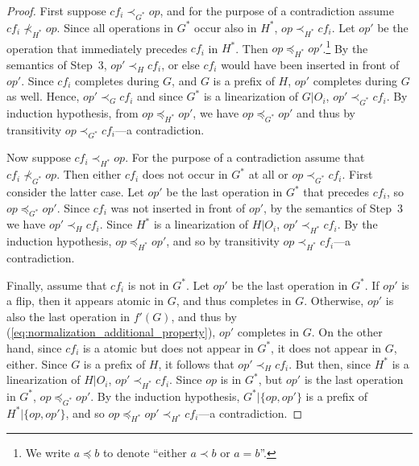 \documentclass[11pt,letterpaper]{article}
\begin{document}
\begin{proof}
  First suppose $cf_i\prec_{G^\ast} op$, and for the purpose of a contradiction assume
  $cf_i\not\prec_{H^\ast} op$.
  Since all operations in $G^\ast$ occur also in $H^\ast$, $op\prec_{H^\ast} cf_i$.
  Let $op'$ be the operation that immediately precedes $cf_i$ in $H^\ast$.
  Then $op\preceq_{H^\ast} op'$.\footnote{We write $a\preceq b$ to denote ``either $a\prec b$ or $a=b$''.}
  By the semantics of Step~3, $op'\prec_H cf_i$, or else $cf_i$ would have been inserted in front of $op'$.
  Since $cf_i$ completes during $G$, and $G$ is a prefix of $H$, $op'$ completes during $G$ as well.
  Hence, $op'\prec_G cf_i$ and since $G^\ast$ is a linearization of $G|O_i$, $op'\prec_{G^\ast} cf_i$.
  By induction hypothesis, from $op\preceq_{H^\ast} op'$, we have $op\preceq_{G^\ast} op'$ and thus by transitivity $op\prec_{G^\ast} cf_i$---a contradiction.

  Now suppose $cf_i\prec_{H^\ast} op$.
  For the purpose of a contradiction assume that $cf_i\not\prec_{G^\ast} op$.
  Then either $cf_i$ does not occur in $G^\ast$ at all or $op \prec_{G^\ast} cf_i$.
  First consider the latter case.
  Let $op'$ be the last operation in $G^\ast$ that precedes $cf_i$, so $op\preceq_{G^\ast} op'$.
  Since $cf_i$ was not inserted in front of $op'$, by the semantics of Step~3 we have $op'\prec_H cf_i$.
  Since $H^\ast$ is a linearization of $H|O_i$, $op'\prec_{H^\ast} cf_i$.
  By the induction hypothesis, $op\preceq_{H^\ast} op'$, and so by transitivity $op\prec_{H^\ast} cf_i$---a contradiction.

  Finally, assume that $cf_i$ is not in $G^\ast$.
  Let $op'$ be the last operation in $G^\ast$.
  If $op'$ is a flip, then it appears atomic in $G$, and thus completes in $G$.
  Otherwise, $op'$ is also the last operation in $f'(G)$, and thus by (\ref{eq:normalization_additional_property}), $op'$ completes in $G$.
  On the other hand, since $cf_i$ is a atomic but does not appear in $G^\ast$, it does not appear in $G$, either.
  Since $G$ is a prefix of $H$, it follows that $op'\prec_H cf_i$.
  But then, since $H^\ast$ is a linearization of $H|O_i$, $op'\prec_{H^\ast} cf_i$.
  Since $op$ is in $G^\ast$, but $op'$ is the last operation in $G^\ast$, $op\preceq_{G^\ast} op'$.
  By the induction hypothesis, $G^\ast|\{op,op'\}$ is a prefix of $H^\ast|\{op,op'\}$, and so $op\preceq_{H^\ast} op'\prec_{H^\ast} cf_i$---a contradiction.
\end{proof}
\end{document}
